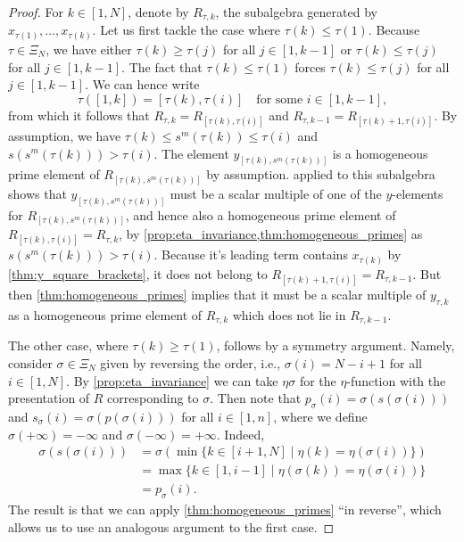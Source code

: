 \begin{proof}

	For $k \in [1, N]$, denote by $R_{\tau, k}$, the subalgebra generated by $x_{\tau(1)},
		\dots, x_{\tau(k)}$. Let us first tackle the case where $\tau(k) \leq \tau(1)$. Because
	$\tau \in \Xi_N$, we have either $\tau(k) \geq \tau(j)$ for all $j\in [1, k - 1]$ or
	$\tau(k) \leq \tau(j)$ for all $j \in [1, k-1]$. The fact that $\tau(k) \leq \tau(1)$
	forces $\tau(k) \leq \tau(j)$ for all $j \in [1, k-1]$. We can hence write
	\begin{equation*}
		\tau([1, k]) = [\tau(k), \tau(i)] \quad \text{for some } i \in [1, k-1],
	\end{equation*}
	from which it follows that $R_{\tau, k} = R_{[\tau(k), \tau(i)]}$ and $R_{\tau, k-1} = R_{[\tau(k) + 1,\tau(i)]}$.
	By assumption, we have $\tau(k) \leq s^m(\tau(k)) \leq \tau(i)$ and $s (s^m(\tau(k))) >
		\tau(i)$. The element $y_{[\tau(k), s^m(\tau(k))]}$ is a homogeneous prime element of
	$R_{[\tau(k), s^m(\tau(k))]}$ by assumption.  applied to
	this subalgebra shows that $y_{[\tau(k), s^m(\tau(k))]}$ must be a scalar multiple of
	one of the $y$-elements for $R_{[\tau(k), s^m(\tau(k))]}$, and hence also a homogeneous
	prime element of $R_{[\tau(k), \tau(i)]} = R_{\tau, k}$, by
	\cref{prop:eta_invariance,thm:homogeneous_primes} as $s(s^m(\tau(k))) > \tau(i)$.
	Because it's leading term contains $x_{\tau(k)}$ by \cref{thm:y_square_brackets}, it
	does not belong to $R_{[\tau(k) + 1, \tau(i)]} = R_{\tau, k-1}$. But then
	\cref{thm:homogeneous_primes} implies that it must be a scalar multiple of $y_{\tau,
				k}$ as a homogeneous prime element of $R_{\tau, k}$ which does not lie in $R_{\tau,
				k-1}$.

	The other case, where $\tau(k) \geq \tau(1)$, follows by a symmetry argument. Namely,
	consider $\sigma \in \Xi_N$ given by reversing the order, i.e., $\sigma(i) = N- i + 1$
	for all $i \in [1, N]$. By \cref{prop:eta_invariance} we can take $\eta \sigma$ for the
	$\eta$-function with the presentation of $R$ corresponding to $\sigma$. Then note that
	$p_\sigma (i) = \sigma (s(\sigma(i)))$ and $s_\sigma (i) = \sigma(p(\sigma(i)))$ for
	all $i\in [1, n]$, where we define $\sigma(+\infty) = -\infty$ and $\sigma(-\infty) =
		+\infty$. Indeed,
	\begin{align*}
		\sigma(s(\sigma(i))) & = \sigma\left(\min \{k \in [i+1, N]\mid \eta(k) = \eta(\sigma(i))\}\right) \\
		                     & = \max\{k \in [1, i-1] \mid \eta(\sigma(k)) = \eta(\sigma(i))\}            \\
		                     & = p_\sigma(i).
	\end{align*}
	The result is that we can apply \cref{thm:homogeneous_primes} ``in reverse'', which
	allows us to use an analogous argument to the first case.
\end{proof}

